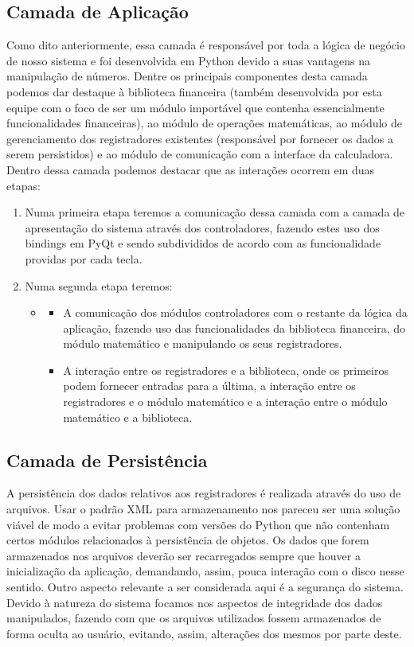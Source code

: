 \subsection{Camada de Aplicação}
Como dito anteriormente, essa camada é responsável por toda a lógica de negócio de nosso sistema e foi desenvolvida em Python devido a suas vantagens na manipulação de números.
Dentre os principais componentes desta camada podemos dar destaque à biblioteca financeira (também desenvolvida por esta equipe com o foco de ser um módulo importável que contenha essencialmente funcionalidades financeiras), ao módulo de operações matemáticas, ao módulo de gerenciamento dos registradores existentes (responsável por fornecer os dados a serem persistidos) e ao módulo de comunicação com a interface da calculadora.
 Dentro dessa camada podemos destacar que as interações ocorrem em duas etapas:
\begin{enumerate}
 \item Numa primeira etapa teremos a comunicação dessa camada com a camada de apresentação do sistema através dos controladores, fazendo estes uso dos bindings em PyQt e sendo subdivididos de acordo com as funcionalidade providas por cada tecla.
 \item Numa segunda etapa teremos:	
 \begin{itemize}
  \item \begin{itemize}
         \item A comunicação dos módulos controladores com o restante da lógica da aplicação, fazendo uso das funcionalidades da biblioteca financeira, do módulo matemático e manipulando os seus registradores.
	 \item A interação entre os registradores e a biblioteca, onde os primeiros podem fornecer entradas para a última, a interação entre os registradores e o módulo matemático e a interação entre o módulo matemático e a biblioteca.
        \end{itemize}
 \end{itemize}
\end{enumerate}

\subsection{Camada de Persistência}
A persistência dos dados relativos aos registradores é realizada através do uso de arquivos. Usar o padrão XML para armazenamento nos pareceu ser uma solução viável de modo a evitar problemas com versões do Python que não contenham certos módulos relacionados à persistência de objetos.
Os dados que forem armazenados nos arquivos deverão ser recarregados sempre que houver a inicialização da aplicação, demandando, assim, pouca interação com o disco nesse sentido.
Outro aspecto relevante a ser considerada aqui é a segurança do sistema.  Devido à natureza do sistema focamos nos aspectos de integridade dos dados manipulados, fazendo com que os arquivos utilizados fossem armazenados de forma oculta ao usuário, evitando, assim, alterações dos mesmos por parte deste.

